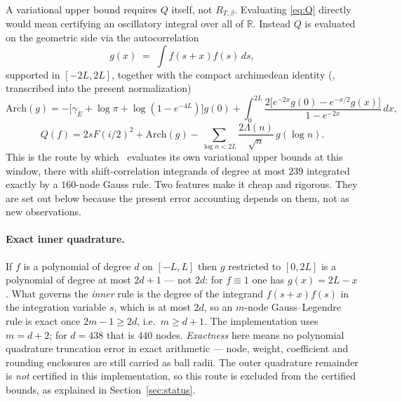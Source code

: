 \documentclass[11pt,a4paper]{article}
\theoremstyle{definition}
\theoremstyle{remark}
\begin{document}
A variational upper bound requires $Q$ itself, not $R_{T,\beta}$. Evaluating
\eqref{eq:Q} directly would mean certifying an oscillatory integral over all of
$\mathbb{R}$. Instead $Q$ is evaluated on the geometric side via the
autocorrelation
\[
   g(x) \;=\; \int f(s+x) f(s)\, ds ,
\]
supported in $[-2L,2L]$, together with the compact archimedean identity
(\cite[Lemma 2.5]{Zhu}, transcribed into the present normalization)
\begin{equation}
\label{eq:arch}
   \mathrm{Arch}(g) = -\big[\gamma_E + \log\pi + \log(1 - e^{-4L})\big] g(0)
   + \int_{0}^{2L} \frac{2\big[e^{-2x}g(0) - e^{-x/2}g(x)\big]}{1 - e^{-2x}}\, dx ,
\end{equation}
\begin{equation}
\label{eq:Qcompact}
   Q(f) = 2sF(i/2)^2 + \mathrm{Arch}(g)
   - \sum_{\log n < 2L} \frac{2\Lambda(n)}{\sqrt n}\, g(\log n) .
\end{equation}
This is the route by which~\cite[\S6.2]{Zhu} evaluates its own variational upper
bounds at this window, there with shift-correlation integrands of degree at most
$239$ integrated exactly by a $160$-node Gauss rule. Two features make it cheap
and rigorous. They are set out below because the present error accounting
depends on them, not as new observations.

\paragraph{Exact inner quadrature.} If $f$ is a polynomial of degree $d$ on
$[-L,L]$ then $g$ restricted to $[0,2L]$ is a polynomial of degree at most
$2d+1$ --- not $2d$: for $f \equiv 1$ one has $g(x) = 2L - x$. What governs the
\emph{inner} rule is the degree of the integrand $f(s+x)f(s)$ in the
integration variable $s$, which is at most $2d$, so an $m$-node
Gauss--Legendre rule is exact once $2m - 1 \ge 2d$, i.e.\ $m \ge d+1$. The implementation uses $m = d+2$; for $d = 438$ that is $440$
nodes. \emph{Exactness} here means no polynomial quadrature truncation error in
exact arithmetic --- node, weight, coefficient and rounding enclosures are still
carried as ball radii. The outer quadrature remainder is \emph{not} certified in
this implementation, so this route is excluded from the certified bounds, as
explained in Section~\ref{sec:status}.
\end{document}

